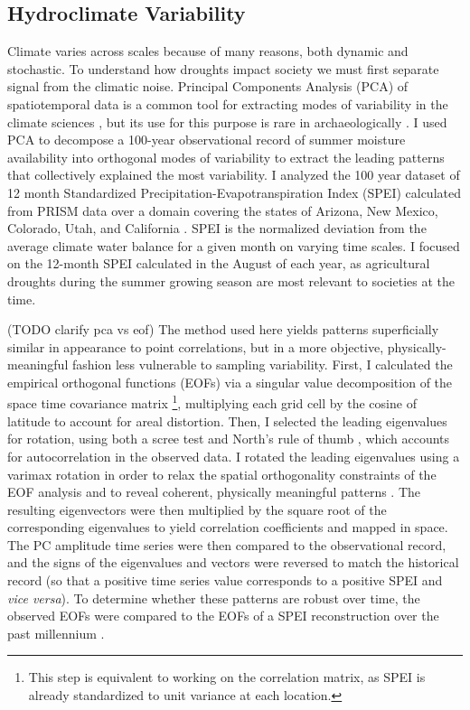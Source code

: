 \documentclass[10pt]{iopart}
\begin{document}
\subsection*{Hydroclimate Variability}
Climate varies across scales because of many reasons, both dynamic and stochastic. To understand how droughts impact society we must first separate signal from the climatic noise. Principal Components Analysis (PCA) of spatiotemporal data is a common tool for extracting modes of variability in the climate sciences \parencite{Lorenz1956,Hannachi2007}, but its use for this purpose is rare in archaeologically \parencite{Weiss1982, Cordell2007}. I used PCA to decompose a 100-year observational record of summer moisture availability into orthogonal modes of variability to extract the leading patterns that collectively explained the most variability. I analyzed the 100 year dataset of 12 month Standardized Precipitation-Evapotranspiration Index (SPEI) calculated from PRISM data over a domain covering the states of Arizona, New Mexico, Colorado, Utah, and California \parencite{Daly1997}. SPEI is the normalized deviation from the average climate water balance for a given month on varying time scales. I focused on the 12-month SPEI calculated in the August of each year, as agricultural droughts during the summer growing season are most relevant to societies at the time.

(TODO clarify pca vs eof) The method used here yields patterns superficially similar in appearance to point correlations, but in a more objective, physically-meaningful fashion less vulnerable to sampling variability. First, I calculated the empirical orthogonal functions (EOFs) via a singular value decomposition of the space time covariance matrix \footnote{This step is equivalent to working on the correlation matrix, as SPEI is already standardized to unit variance at each location.}, multiplying each grid cell by the cosine of latitude to account for areal distortion. Then, I selected the leading eigenvalues for rotation, using both a scree test and North's rule of thumb \parencite{North1982}, which accounts for autocorrelation in the observed data. I rotated the leading eigenvalues using a varimax rotation in order to relax the spatial orthogonality constraints of the EOF analysis and to reveal coherent, physically meaningful patterns \parencite{Richman1986}. The resulting eigenvectors were then multiplied by the square root of the corresponding eigenvalues to yield correlation coefficients and mapped in space. The PC amplitude time series were then compared to the observational record, and the signs of the eigenvalues and vectors were reversed to match the historical record (so that a positive time series value corresponds to a positive SPEI and \textit{vice versa}). To determine whether these patterns are robust over time, the observed EOFs were compared to the EOFs of a SPEI reconstruction over the past millennium \parencite{Steiger2018}.
\end{document}
